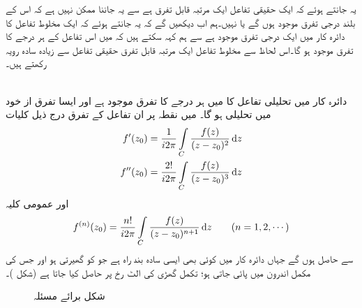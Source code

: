 یہ جانتے ہوئے کہ ایک حقیقی تفاعل ایک مرتبہ قابل تفرق ہے سے یہ جاننا ممکن نہیں ہے کہ  اس کے بلند درجی تفرق موجود ہوں گے یا نہیں۔ہم اب دیکھیں گے کہ یہ جانتے ہوئے کہ ایک مخلوط تفاعل کا دائرہ کار  میں  ایک درجی تفرق موجود ہے سے ہم کہہ سکتے ہیں کہ  میں اس تفاعل کے ہر درجے کا تفرق موجود ہو گا۔اس لحاظ سے مخلوط تفاعل ایک مرتبہ قابل تفرق حقیقی تفاعل سے زیادہ سادہ رویہ رکھتے ہیں۔

\quad {}\\
دائرہ کار  میں تحلیلی تفاعل  کا  میں ہر درجے کا تفرق موجود ہے اور ایسا تفرق از خود  میں تحلیلی ہو گا۔  میں نقطہ  پر ان تفاعل کے تفرق درج ذیل کلیات
\begin{align}
f'(z_0)&=\frac{1}{i2\pi}\int\limits_C \frac{f(z)}{(z-z_0)^2}\dif z\label{مساوات_مخلوط_تکمل_تحلیلی_تفاعل_تفرق_الف}\\
f''(z_0)&=\frac{2!}{i2\pi}\int\limits_C \frac{f(z)}{(z-z_0)^3}\dif z\label{مساوات_مخلوط_تکمل_تحلیلی_تفاعل_تفرق_ب}
\end{align}
اور عمومی کلیہ
\begin{align}\label{مساوات_مخلوط_تکمل_تحلیلی_تفاعل_کے_تفرق}
f^{(n)}(z_0)=\frac{n!}{i2\pi}\int\limits_C \frac{f(z)}{(z-z_0)^{n+1}}\dif z\quad \quad (n=1,2,\cdots)
\end{align}
سے حاصل ہوں گے جہاں  دائرہ کار  میں  کوئی بھی ایسی سادہ بند راہ ہے جو  کو گھیرتی ہو اور جس کی مکمل اندرون  میں پائی جاتی ہو؛ تکمل گھڑی کی الٹ رخ  پر حاصل کیا جاتا ہے (شکل )۔ 
\begin{figure}
\centering
{}
\caption{شکل برائے مسئلہ }
\label{شکل_مسئلہ_مخلوط_تکمل_تحلیلی_تفاعل_کے_تفرق}
\end{figure}

